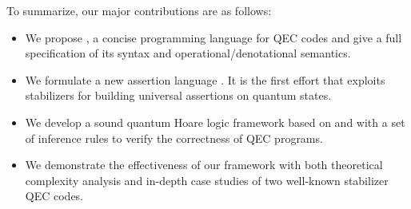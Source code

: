 To summarize, our major contributions are as follows:
\begin{itemize}
    \item We propose {\langname}, a concise  programming language for QEC codes and give a full specification of its syntax and operational/denotational semantics. 
    \item We formulate a new assertion language {\assnname}. It is the first effort that exploits stabilizers for building universal assertions on quantum states.
    \item We develop a sound quantum Hoare logic framework based on {\assnname} and {\langname} with a set of inference rules to verify the correctness of QEC programs. 
    \item  We demonstrate the effectiveness of our framework with both theoretical complexity analysis and in-depth case studies of two well-known stabilizer QEC codes.
\end{itemize}



